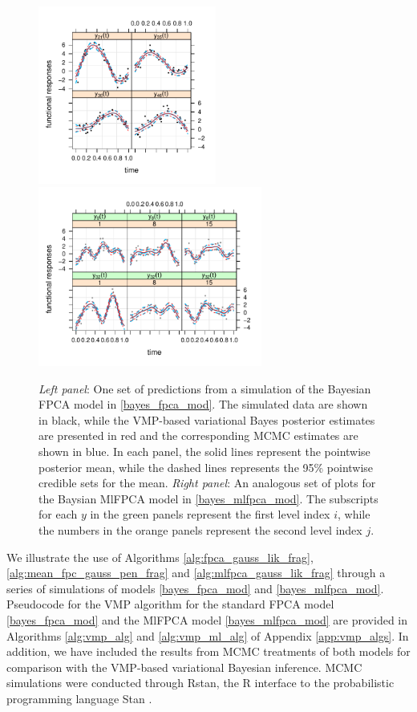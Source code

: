 \documentclass[ba]{imsart}
\numberwithin{equation}{section}
\theoremstyle{plain}
\begin{document}
\begin{figure}
	\centering
	\includegraphics[width=2.3in]{images/fpca_fits.pdf}
	\includegraphics[width=2.9in]{images/mlfpca_fits.pdf}
\caption{
	\emph{Left panel}: One set of predictions from a simulation of the Bayesian FPCA model
	in \eqref{bayes_fpca_mod}. The simulated data are shown in black, while the VMP-based
	variational Bayes posterior estimates are presented in red and the corresponding MCMC estimates
	are shown in blue. In each panel, the solid lines represent the pointwise posterior mean, while the dashed lines
	represents the 95\% pointwise credible sets for the mean.
	\emph{Right panel}: An analogous set of plots for the Baysian MlFPCA model in
	\eqref{bayes_mlfpca_mod}. The subscripts for each $y$ in the green panels represent the first level
	index $i$, while the numbers in the orange panels represent the second level index $j$.
}
\label{fig:fpca_pred}
\end{figure}

We illustrate the use of Algorithms \ref{alg:fpca_gauss_lik_frag}, \ref{alg:mean_fpc_gauss_pen_frag} and
\ref{alg:mlfpca_gauss_lik_frag}
through a series of simulations of models \eqref{bayes_fpca_mod} and \eqref{bayes_mlfpca_mod}.
Pseudocode for the VMP algorithm for the standard FPCA model \eqref{bayes_fpca_mod} and
the MlFPCA model \eqref{bayes_mlfpca_mod} are provided in Algorithms \ref{alg:vmp_alg}
and \ref{alg:vmp_ml_alg} of Appendix \ref{app:vmp_algs}.
In addition, we have included the results from MCMC
treatments of both models for comparison with
the VMP-based variational Bayesian inference.
MCMC simulations were conducted through \textsf{Rstan}, the \textsf{R} \citep{r20} interface to the probabilistic
programming language \textsf{Stan} \citep{rstan20}.
\end{document}
